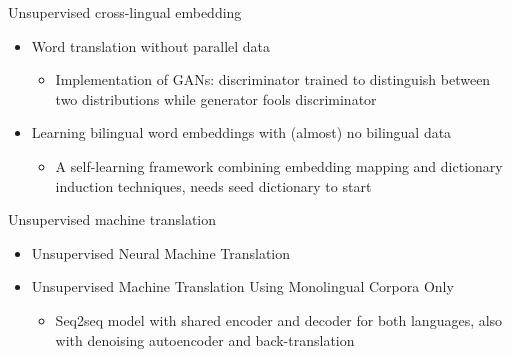 \documentclass[11pt, a4paper, landscape]{article}
\begin{document}
	
	
	
	\NewPage
	
	\vfill
	Unsupervised cross-lingual embedding
	\begin{itemize}
		\item 	\cite{conneau2017word} Word translation without parallel data
		\begin{itemize}
		\item Implementation of GANs: discriminator trained to distinguish between two distributions while generator fools discriminator 
		\end{itemize}	
		\item 	\cite{artetxe2017learning} Learning bilingual word embeddings with (almost) no bilingual data
		\begin{itemize}
			\item A self-learning framework combining embedding mapping and dictionary induction techniques, needs seed dictionary to start
		\end{itemize}	    

	\end{itemize}
	
	
	
	
	
	
	\vfill
	
	\NewPage
	
	\vfill
	Unsupervised machine translation
	\begin{itemize}
		\item 	\cite{artetxe2017unsupervised} Unsupervised Neural Machine Translation
		\item \cite{lample2017unsupervised} Unsupervised Machine Translation Using Monolingual Corpora Only
		\begin{itemize} 
			\item Seq2seq model with shared encoder and decoder for both languages, also with denoising autoencoder and back-translation
		\end{itemize}
	
		

	\end{itemize}
	
	\vfill



	\NewPage
	\vfill
	
\end{document}
